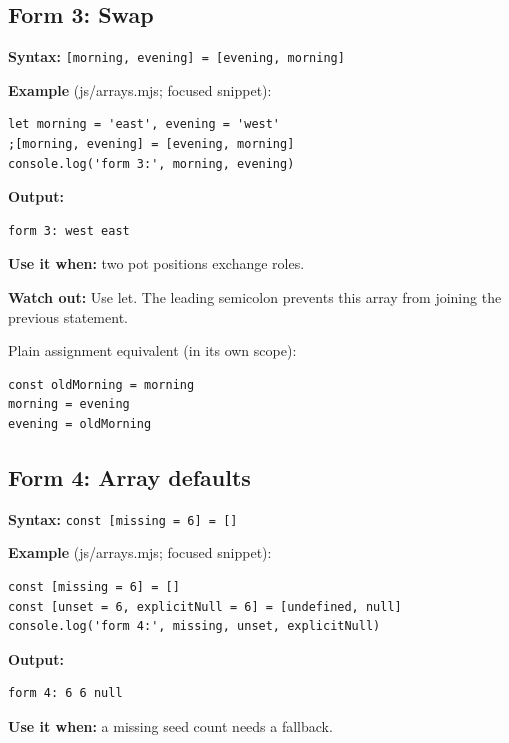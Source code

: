 \documentclass[
  10pt,
  a4paper,
]{article}
\begin{document}
\subsection{Form 3: Swap}\label{form-3-swap}

\textbf{Syntax:}
\texttt{[morning,\allowbreak{} evening] =\allowbreak{} [evening,\allowbreak{} morning]}

\textbf{Example} (js/arrays.mjs; focused snippet):

\begin{lstlisting}
let morning = 'east', evening = 'west'
;[morning, evening] = [evening, morning]
console.log('form 3:', morning, evening)
\end{lstlisting}

\textbf{Output:}

\begin{lstlisting}
form 3: west east
\end{lstlisting}

\textbf{Use it when:} two pot positions exchange roles.

\textbf{Watch out:} Use let. The leading semicolon prevents this array
from joining the previous statement.

Plain assignment equivalent (in its own scope):

\begin{lstlisting}
const oldMorning = morning
morning = evening
evening = oldMorning
\end{lstlisting}

\subsection{Form 4: Array defaults}\label{form-4-array-defaults}

\textbf{Syntax:}
\texttt{const [missing =\allowbreak{} 6] =\allowbreak{} []}

\textbf{Example} (js/arrays.mjs; focused snippet):

\begin{lstlisting}
const [missing = 6] = []
const [unset = 6, explicitNull = 6] = [undefined, null]
console.log('form 4:', missing, unset, explicitNull)
\end{lstlisting}

\textbf{Output:}

\begin{lstlisting}
form 4: 6 6 null
\end{lstlisting}

\textbf{Use it when:} a missing seed count needs a fallback.
\end{document}
